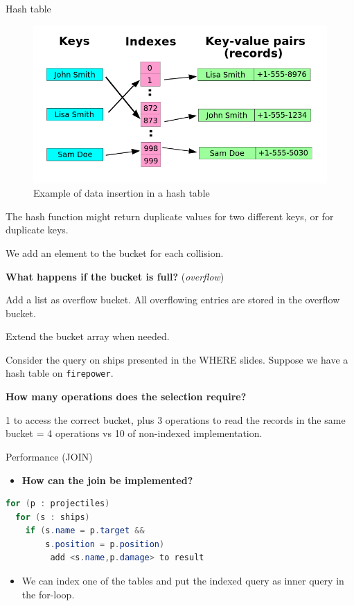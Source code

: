 \documentclass{beamer}
\begin{document}
\begin{frame}{Hash table}
\begin{figure}
\centering
\includegraphics[scale=0.25]{img/hash_table}
\caption{Example of data insertion in a hash table}
\end{figure}
\end{frame}

\begin{slide}{
\item The hash function might return duplicate values for two different keys, or for duplicate keys.
\item We add an element to the bucket for each collision.
\item \textbf{What happens if the bucket is full?} (\textit{overflow})
\pause
\item Add a list as overflow bucket. All overflowing entries are stored in the overflow bucket.
\item Extend the bucket array when needed.
}\end{slide}

\begin{slide}{
\item Consider the query on ships presented in the WHERE slides. Suppose we have a hash table on \texttt{firepower}.
\item \textbf{How many operations does the selection require?}
\pause
\item 1 to access the correct bucket, plus 3 operations to read the records in the same bucket = 4 operations vs 10 of non-indexed implementation.
}\end{slide}

\begin{frame}[fragile]{Performance (JOIN)}
\begin{itemize}
\item \textbf{How can the join be implemented?}
\pause
\end{itemize}
\begin{lstlisting}[language = Java]
for (p : projectiles)
  for (s : ships)
    if (s.name = p.target &&
        s.position = p.position)
         add <s.name,p.damage> to result
\end{lstlisting}
\begin{itemize}
\item We can index one of the tables and put the indexed query as inner query in the for-loop.
\end{itemize}
\end{frame}
\end{document}
